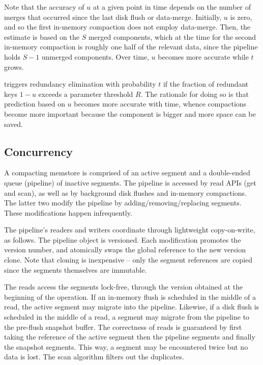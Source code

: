 Note that the accuracy of $u$ at a given point in time depends on the number of merges that occurred since the last disk flush
or data-merge.
Initially, $u$ is zero, and so the first in-memory compaction does not employ data-merge.
Then, the estimate is based on the $S$ merged components, which at the time for the second in-memory compaction
is roughly one half of the relevant data, since the pipeline holds $S-1$ unmerged components. 
Over time, $u$ becomes more accurate while $t$ grows. 

\adp\/ triggers redundancy elimination with probability $t$ if the fraction of redundant keys $1-u$ exceeds a parameter 
threshold $R$. The rationale for doing so is that prediction based on $u$ becomes more accurate with time, whence 
compactions become more important because the component is bigger and more space can be saved.



\subsection{Concurrency} \label{ssec:impl-details}

A compacting memstore is comprised of an active segment and a double-ended queue (pipeline) of inactive segments. 
The pipeline is accessed by read APIs (get and scan), as well as by background disk flushes and in-memory compactions. 
The latter two modify the pipeline by adding/removing/replacing segments. These modifications happen infrequently. 

The pipeline's readers and writers coordinate through lightweight copy-on-write, as follows. The pipeline object is versioned. 
Each modification promotes the version number, and atomically swaps the global reference to the new version clone. Note
that cloning is inexpensive -- only the segment references are copied since the segments themselves are immutable. 

The reads access the segments lock-free, through the version obtained at the beginning of the operation. 
If an in-memory flush is scheduled in the middle of a read, the active segment may migrate into the pipeline. 
Likewise, if a disk flush is scheduled in the middle of a read, a segment may migrate from the pipeline to the pre-flush snapshot buffer. 
The correctness of reads  is guaranteed by first taking the reference of the active segment then the pipeline segments and finally the snapshot segments. This way, a segment may be encountered twice but no data is 
lost. The scan algorithm filters out the duplicates. 


